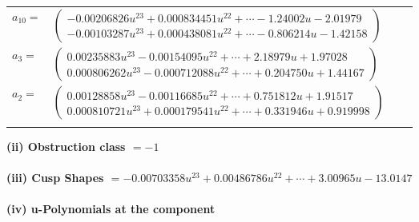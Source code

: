\documentclass[1p]{elsarticle_modified}
\theoremstyle{definition}
\begin{document}
\begin{tabular}{m{7pt} m{180pt} m{7pt} m{180pt} }
\flushright $a_{10}=$&$\begin{pmatrix}-0.00206826 u^{23}+0.000834451 u^{22}+\cdots-1.24002 u-2.01979\\-0.00103287 u^{23}+0.000438081 u^{22}+\cdots-0.806214 u-1.42158\end{pmatrix}$ \\
\flushright $a_{3}=$&$\begin{pmatrix}0.00235883 u^{23}-0.00154095 u^{22}+\cdots+2.18979 u+1.97028\\0.000806262 u^{23}-0.000712088 u^{22}+\cdots+0.204750 u+1.44167\end{pmatrix}$ \\
\flushright $a_{2}=$&$\begin{pmatrix}0.00128858 u^{23}-0.00116685 u^{22}+\cdots+0.751812 u+1.91517\\0.000810721 u^{23}+0.000179541 u^{22}+\cdots+0.331946 u+0.919998\end{pmatrix}$\\&\end{tabular}
\flushleft \textbf{(ii) Obstruction class $= -1$}\\~\\
\flushleft \textbf{(iii) Cusp Shapes $= -0.00703358 u^{23}+0.00486786 u^{22}+\cdots+3.00965 u-13.0147$}\\~\\
\newpage\renewcommand{\arraystretch}{1}
\flushleft \textbf{(iv) u-Polynomials at the component}\newline \\
\end{document}
